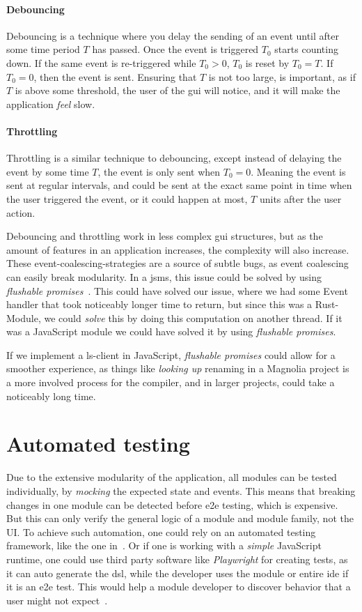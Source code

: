 \paragraph{Debouncing} Debouncing is a technique where you delay the sending of
an event until after some time period $T$ has passed. Once the event is triggered
$T_0$ starts counting down. If the same event is re-triggered while $T_0 > 0$,
$T_0$ is reset by $T_0 = T$. If $T_0 = 0$, then the event is sent. Ensuring that
$T$ is not too large, is important, as if $T$ is above some threshold, the user
of the \gls*{gui} will notice, and it will make the application \textit{feel}
slow.

\paragraph{Throttling} Throttling is a similar technique to debouncing, except
instead of delaying the event by some time $T$, the event is only sent when
$T_0 = 0$. Meaning the event is sent at regular intervals, and could be sent at
the exact same point in time when the user triggered the event, or it could
happen at most, $T$ units after the user action.

Debouncing and throttling work in less complex \gls*{gui} structures, but as the
amount of features in an application increases, the complexity will also
increase. These event-coalescing-strategies are a source of subtle bugs, as
event coalescing can easily break modularity. In a \gls*{jsms}, this issue could
be solved by using \textit{flushable promises}~\cite{flush}. This could have
solved our issue, where we had some Event handler that took noticeably longer
time to return, but since this was a Rust-Module, we could \textit{solve} this
by doing this computation on another thread. If it was a JavaScript module we
could have solved it by using \textit{flushable promises}.

If we implement a \gls*{ls}-client in JavaScript, \textit{flushable promises}
could allow for a smoother experience, as things like \textit{looking up}
renaming in a Magnolia project is a more involved process for the compiler,
and in larger projects, could take a noticeably long time.


\section{Automated testing}

Due to the extensive modularity of the application, all modules can be tested
individually, by \textit{mocking} the expected state and events. This means that
breaking changes in one module can be detected before \gls*{e2e} testing, which
is expensive. But this can only verify the general logic of a module and module
family, not the UI. To achieve such automation, one could rely on an automated
testing framework, like the one in~\cite{autoUi}. Or if one is working with a
\textit{simple} JavaScript runtime, one could use third party software like
\textit{Playwright} for creating tests, as it can auto generate the \gls*{dsl},
while the developer uses the module or entire \gls*{ide} if it is an \gls*{e2e}
test. This would help a module developer to discover behavior that a user might
not expect~\cite{leastGui}.


